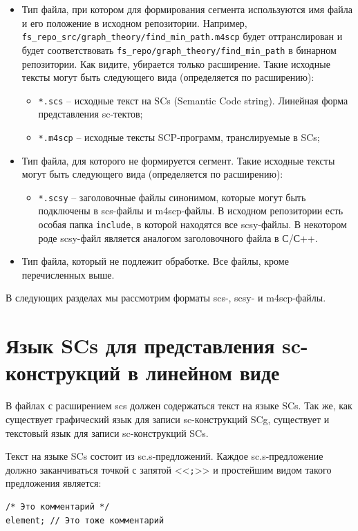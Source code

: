 \begin{itemize}
\item Тип файла, при котором для формирования сегмента используются
  имя файла и его положение в исходном репозитории. Например,
  \verb|fs_repo_src/graph_theory/find_min_path.m4scp| будет
  оттранслирован и будет соответствовать
  \verb|fs_repo/graph_theory/find_min_path| в бинарном
  репозитории. Как видите, убирается только расширение. Такие исходные
  тексты могут быть следующего вида (определяется по расширению):
  \begin{itemize}
  \item \texttt{*.scs} – исходные текст на SCs (Semantic Code
    string). Линейная форма представления sc-тектов;
  \item \texttt{*.m4scp} – исходные тексты SCP-программ, транслируемые
    в SCs;
  \end{itemize}

\item Тип файла, для которого не формируется сегмент. Такие исходные
  тексты могут быть следующего вида (определяется по расширению):
  \begin{itemize}
  \item \texttt{*.scsy} – заголовочные файлы синонимом, которые могут
    быть подключены в scs-файлы и m4scp-файлы. В исходном репозитории
    есть особая папка \verb|include|, в которой находятся все
    scsy-файлы. В некотором роде scsy-файл является аналогом
    заголовочного файла в С/С++.
  \end{itemize}

\item Тип файла, который не подлежит обработке. Все файлы, кроме
  перечисленных выше.
\end{itemize}

В следующих разделах мы рассмотрим форматы scs-, scsy- и m4scp-файлы.

\section{Язык SCs для представления sc-конструкций в линейном виде}

В файлах с расширением scs должен содержаться текст на языке SCs. Так
же, как существует графический язык для записи sc-конструкций SCg,
существует и текстовый язык для записи sc-конструкций SCs.

Текст на языке SCs состоит из sc.s-предложений. Каждое
sc.s-предложение должно заканчиваться точкой с запятой <<\texttt{;}>> и
простейшим видом такого предложения является:
\begin{verbatim}
/* Это комментарий */
element; // Это тоже комментарий
\end{verbatim}

